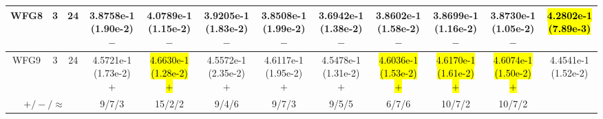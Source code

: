 \documentclass[journal]{IEEEtran}
\begin{document}
\begin{table*}[htbp]
\begin{tabular}{cccccccccccc}
\hline
\multirow{1}{*}{WFG8}&3&24&3.8758e-1 (1.90e-2) $-$&4.0789e-1 (1.15e-2) $-$&3.9205e-1 (1.83e-2) $-$&3.8508e-1 (1.99e-2) $-$&3.6942e-1 (1.38e-2) $-$&3.8602e-1 (1.58e-2) $-$&3.8699e-1 (1.16e-2) $-$&3.8730e-1 (1.05e-2) $-$&\hl{4.2802e-1 (7.89e-3)}\\
\hline
\multirow{1}{*}{WFG9}&3&24&4.5721e-1 (1.73e-2) $+$&\hl{4.6630e-1 (1.28e-2) $+$}&4.5572e-1 (2.35e-2) $+$&4.6117e-1 (1.95e-2) $+$&4.5478e-1 (1.31e-2) $+$&\hl{4.6036e-1 (1.53e-2) $+$}&\hl{4.6170e-1 (1.61e-2) $+$}&\hl{4.6074e-1 (1.50e-2) $+$}&4.4541e-1 (1.52e-2)\\
\hline
\multicolumn{3}{c}{$+/-/\approx$}&9/7/3&15/2/2&9/4/6&9/7/3&9/5/5&6/7/6&10/7/2&10/7/2&\\
\bottomrule
\end{tabular}
\label{No Label}
\end{table*}
\end{document}
